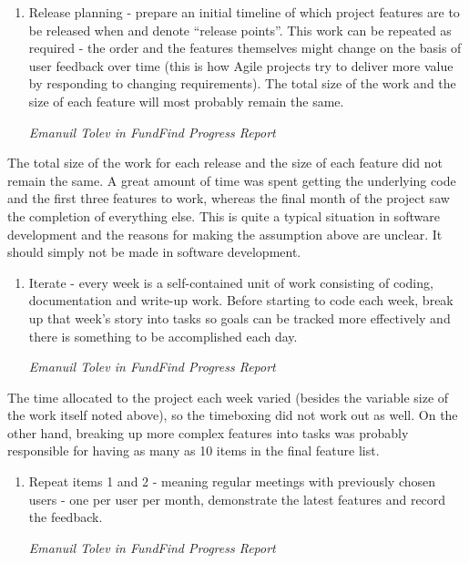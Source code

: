 \begin{shadequote}
\begin{enumerate}
	\setcounter{enumi}{\thetmpc}
	\item Release planning - prepare an initial timeline of which project features are to be released when and denote ``release points''. This work can be repeated as required - the order and the features themselves might change on the basis of user feedback over time (this is how Agile projects try to deliver more value by responding to changing requirements). The total size of the work and the size of each feature will most probably remain the same.
	\par\emph{Emanuil Tolev in FundFind Progress Report \cite{progress-report}}
	\setcounter{tmpc}{\theenumi}
\end{enumerate}
\end{shadequote}

The total size of the work for each release and the size of each feature did not remain the same. A great amount of time was spent getting the underlying code and the first three features to work, whereas the final month of the project saw the completion of everything else. This is quite a typical situation in software development and the reasons for making the assumption above are unclear. It should simply not be made in software development.

\begin{shadequote}
\begin{enumerate}
	\setcounter{enumi}{\thetmpc}
	\item Iterate - every week is a self-contained unit of work consisting of coding, documentation and write-up work. Before starting to code each week, break up that week's story into tasks so goals can be tracked more effectively and there is something to be accomplished each day.
	\par\emph{Emanuil Tolev in FundFind Progress Report \cite{progress-report}}
	\setcounter{tmpc}{\theenumi}
\end{enumerate}
\end{shadequote}

The time allocated to the project each week varied (besides the variable size of the work itself noted above), so the timeboxing did not work out as well. On the other hand, breaking up more complex features into tasks was probably responsible for having as many as 10 items in the final feature list.

\begin{shadequote}
\begin{enumerate}
	\setcounter{enumi}{\thetmpc}
	\item Repeat items 1 and 2 - meaning regular meetings with previously chosen users - one per user per month, demonstrate the latest features and record the feedback.
	\par\emph{Emanuil Tolev in FundFind Progress Report \cite{progress-report}}
	\setcounter{tmpc}{\theenumi}
\end{enumerate}
\end{shadequote}
	
